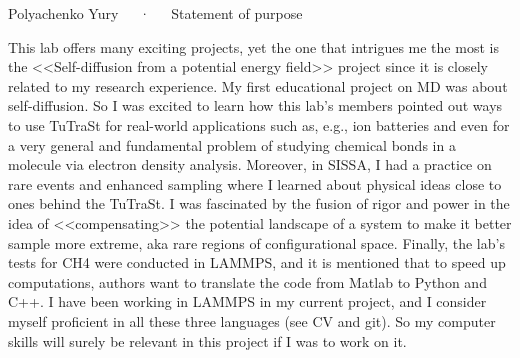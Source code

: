 \documentclass[12pt, a4paper]{awesome-cv}
\begin{document}
\makecvheader[C]

\makecvfooter
  {\thepage}
  {Polyachenko Yury~~~·~~~Statement of purpose}
  {\thepage}

\vspace{25pt}
\hspace{5pt}

\begin{cvletter}

This lab offers many exciting projects, yet the one that intrigues me the most is the <<Self-diffusion from a potential energy field>> project since it is closely related to my research experience. My first educational project on MD was about self-diffusion. So I was excited to learn how this lab's members pointed out ways to use TuTraSt for real-world applications such as, e.g., ion batteries and even for a very general and fundamental problem of studying chemical bonds in a molecule via electron density analysis. Moreover, in SISSA, I had a practice on rare events and enhanced sampling where I learned about physical ideas close to ones behind the TuTraSt. I was fascinated by the fusion of rigor and power in the idea of <<compensating>> the potential landscape of a system to make it better sample more extreme, aka rare regions of configurational space. Finally, the lab's tests for CH4 were conducted in LAMMPS, and it is mentioned that to speed up computations, authors want to translate the code from Matlab to Python and C++. I have been working in LAMMPS in my current project, and I consider myself proficient in all these three languages (see CV and git). So my computer skills will surely be relevant in this project if I was to work on it.


\end{cvletter}
\end{document}
